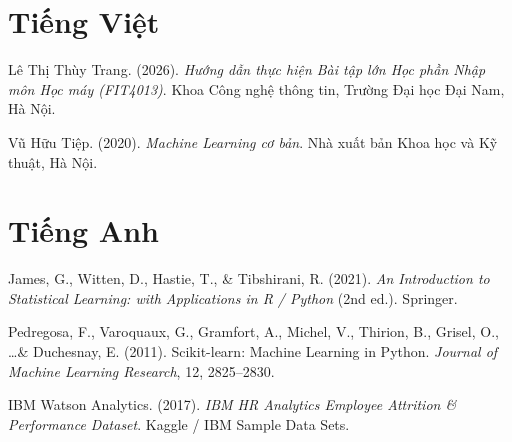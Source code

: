
\section*{Tiếng Việt}

\begin{enumerate}[label={[\arabic*]}]
    \item Lê Thị Thùy Trang. (2026). \textit{Hướng dẫn thực hiện Bài tập lớn Học phần Nhập môn Học máy (FIT4013)}. Khoa Công nghệ thông tin, Trường Đại học Đại Nam, Hà Nội.
    \item Vũ Hữu Tiệp. (2020). \textit{Machine Learning cơ bản}. Nhà xuất bản Khoa học và Kỹ thuật, Hà Nội.
\end{enumerate}

\section*{Tiếng Anh}

\begin{enumerate}[label={[\arabic*]}, resume]
    \item James, G., Witten, D., Hastie, T., \& Tibshirani, R. (2021). \textit{An Introduction to Statistical Learning: with Applications in R / Python} (2nd ed.). Springer.
    \item Pedregosa, F., Varoquaux, G., Gramfort, A., Michel, V., Thirion, B., Grisel, O., \ldots \& Duchesnay, E. (2011). Scikit-learn: Machine Learning in Python. \textit{Journal of Machine Learning Research}, 12, 2825--2830.
    \item IBM Watson Analytics. (2017). \textit{IBM HR Analytics Employee Attrition \& Performance Dataset}. Kaggle / IBM Sample Data Sets.
\end{enumerate}

